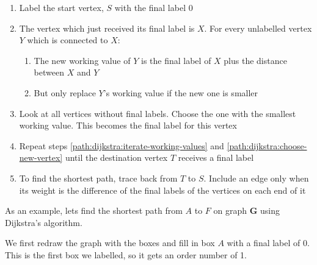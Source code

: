 \documentclass[../main.tex]{subfile}
\begin{document}
\begin{enumerate}
	\item Label the start vertex, $S$ with the final label 0
	\item\label{path:dijkstra:iterate-working-values} The vertex which just received its final label is $X$. For every unlabelled vertex $Y$ which is connected to $X$: \begin{enumerate}
			\item The new working value of $Y$ is the final label of $X$ plus the distance between $X$ and $Y$
			\item But only replace $Y$'s working value if the new one is smaller
	\end{enumerate}
	\item\label{path:dijkstra:choose-new-vertex} Look at all vertices without final labels. Choose the one with the smallest working value. This becomes the final label for this vertex
	\item Repeat steps \ref{path:dijkstra:iterate-working-values} and \ref{path:dijkstra:choose-new-vertex} until the destination vertex $T$ receives a final label
	\item To find the shortest path, trace back from $T$ to $S$. Include an edge only when its weight is the difference of the final labels of the vertices on each end of it
\end{enumerate}

As an example, lets find the shortest path from $A$ to $F$ on graph $\mathbf{G}$ using Dijkstra's algorithm.

We first redraw the graph with the boxes and fill in box $A$ with a final label of 0. This is the first box we labelled, so it gets an order number of 1.

\begin{figure}[H]
\centering
{}
\end{figure}
\end{document}
